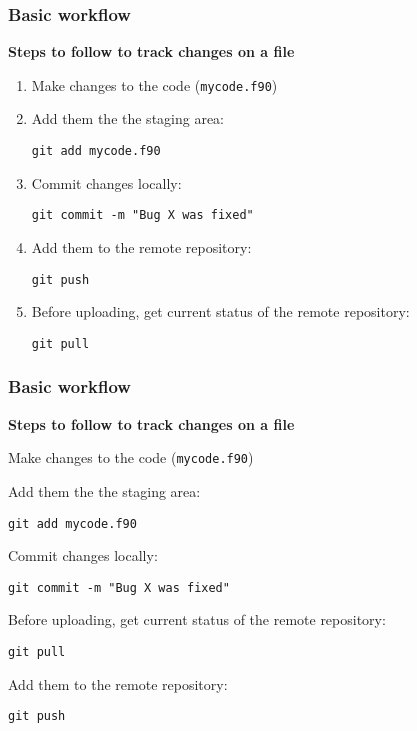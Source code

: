 \documentclass[xcolor=dvipsnames,10pt]{beamer}
\begin{document}
\begin{frame}
 \frametitle{Basic workflow}
 
 \textbf{Steps to follow to track changes on a file}
 
 \begin{enumerate}
  \item Make changes to the code  (\texttt{mycode.f90})
  \vspace*{0.2cm}
  
  \item Add them the the staging area: 
  
  \texttt{git add mycode.f90}
  \vspace*{0.2cm}
  
  \item Commit changes locally:
  
  \texttt{git commit -m "Bug X was fixed"}
  \vspace*{0.2cm}
  
  \item Add them to the remote repository:
  
  \texttt{git push}
     \vspace*{0.2cm}
  
  \color{white}
  \item[] Before uploading, get current status of the remote repository:
  
  \texttt{git pull}
 \end{enumerate}

\end{frame}
\addtocounter{framenumber}{-1}
\begin{frame}
 \frametitle{Basic workflow}
 
 \textbf{Steps to follow to track changes on a file}
 
 \begin{enumerate}
  \item Make changes to the code (\texttt{mycode.f90})
  \vspace*{0.2cm}
  
  \item Add them the the staging area: 
  
  \texttt{git add mycode.f90} 
  \vspace*{0.2cm}
  
  \item Commit changes locally:
  
  \texttt{git commit -m "Bug X was fixed"}
  \vspace*{0.2cm}
  
  {
  \color{blue}
  \item[*] Before uploading, get current status of the remote repository:
  
  \texttt{git pull}
  }
  \vspace*{0.2cm}
  
  
  \item Add them to the remote repository:
  
  \texttt{git push}
 \end{enumerate}

\end{frame}
\end{document}
